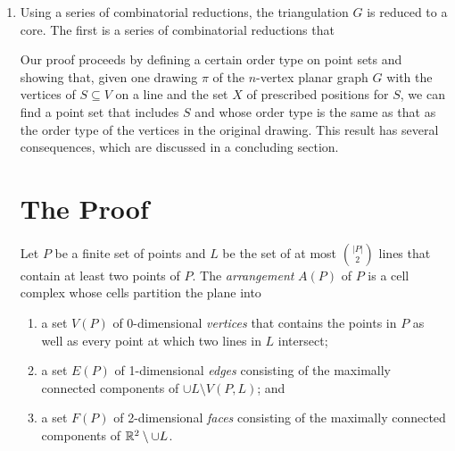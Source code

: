 \documentclass{patmorin}
\begin{document}
\begin{enumerate}
\item Using a series of combinatorial reductions, the triangulation $G$ is reduced to a core.  The
first is a series of combinatorial reductions that







Our proof
proceeds by defining a certain order type on point sets and showing
that, given one drawing $\pi$ of the $n$-vertex planar graph $G$ with
the vertices of $S\subseteq V$ on a line and the set $X$ of prescribed
positions for $S$, we can find a point set that includes $S$ and whose
order type is the same as that as the order type of the vertices in
the original drawing.  This result has several consequences, which are
discussed in a concluding section.

\section{The Proof}

Let $P$ be a finite set of points and $L$ be the set of at most
$\binom{|P|}{2}$ lines that contain at least two points of $P$.
The \emph{arrangement} $A(P)$ of $P$ is a cell complex whose cells
partition the plane into
\begin{enumerate}
  \item a set $V(P)$ of 0-dimensional \emph{vertices} that contains
  the points in $P$ as well as every point at which two lines in $L$
  intersect;

  \item a set $E(P)$ of 1-dimensional \emph{edges} consisting of the
  maximally connected components of $\cup L\setminus V(P,L)$; and

  \item a set $F(P)$ of 2-dimensional \emph{faces} consisting of the
   maximally connected components of $\mathbb{R}^2\setminus \cup L$.
\end{enumerate}


\end{enumerate}
\end{document}
